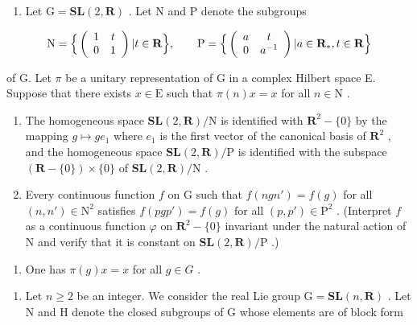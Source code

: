\begin{enumerate}
\def\labelenumi{\arabic{enumi})}
\setcounter{enumi}{17}
\tightlist
\item
  Let \(\mathrm{G} = \mathbf{SL}(2, \mathbf{R})\) . Let N and P denote the subgroups
\end{enumerate}

\[
\mathrm{N} = \Big \{\left( \begin{array}{c c} 1 & t \\ 0 & 1 \end{array} \right) | t \in \mathbf {R} \Big \}, \qquad \mathrm{P} = \Big \{\left( \begin{array}{c c} a & t \\ 0 & a ^ {- 1} \end{array} \right) | a \in \mathbf {R} _ {*}, t \in \mathbf {R} \Big \}
\]

of G. Let \(\pi\) be a unitary representation of G in a complex Hilbert space E. Suppose that there exists \(x \in \mathrm{E}\) such that \(\pi(n)x = x\) for all \(n \in \mathrm{N}\) .

\begin{enumerate}
\def\labelenumi{\alph{enumi})}
\tightlist
\item
  The homogeneous space \(\mathbf{SL}(2, \mathbf{R}) / \mathrm{N}\) is identified with \(\mathbf{R}^2 - \{0\}\) by the mapping \(g \mapsto ge_1\) where \(e_1\) is the first vector of the canonical basis of \(\mathbf{R}^2\) , and the homogeneous space \(\mathbf{SL}(2, \mathbf{R}) / \mathrm{P}\) is identified with the subspace \((\mathbf{R} - \{0\}) \times \{0\}\) of \(\mathbf{SL}(2, \mathbf{R}) / \mathrm{N}\) .
\item
  Every continuous function \(f\) on G such that \(f(ngn') = f(g)\) for all \((n, n') \in \mathrm{N}^2\) satisfies \(f(pgp') = f(g)\) for all \((p, p') \in \mathrm{P}^2\) . (Interpret \(f\) as a continuous function \(\varphi\) on \(\mathbf{R}^2 - \{0\}\) invariant under the natural action of N and verify that it is constant on \(\mathbf{SL}(2, \mathbf{R}) / \mathrm{P}\) .)
\end{enumerate}

\begin{enumerate}
\def\labelenumi{\alph{enumi})}
\setcounter{enumi}{2}
\tightlist
\item
  One has \(\pi(g)x = x\) for all \(g \in G\) .
\end{enumerate}

\begin{enumerate}
\def\labelenumi{\arabic{enumi})}
\setcounter{enumi}{18}
\tightlist
\item
  Let \(n \geqslant 2\) be an integer. We consider the real Lie group \(\mathrm{G} = \mathbf{SL}(n, \mathbf{R})\) . Let N and H denote the closed subgroups of G whose elements are of block form
\end{enumerate}

